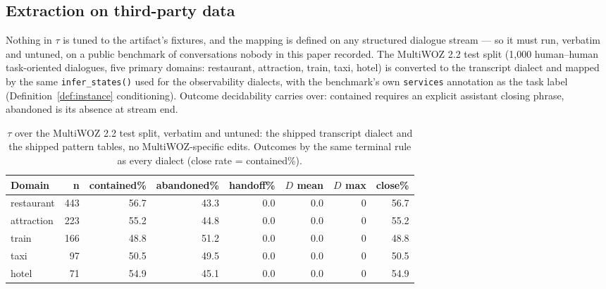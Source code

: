 \subsection{Extraction on third-party data}
\label{sec:multiwoz}
Nothing in $\tau$ is tuned to the artifact's fixtures, and the mapping is defined on any
structured dialogue stream --- so it must run, verbatim and untuned, on a public benchmark of
conversations nobody in this paper recorded.
The MultiWOZ 2.2 test split \citep{multiwoz2026,multiwoz2018} (1{,}000 human--human task-oriented dialogues,
five primary domains: restaurant, attraction, train, taxi, hotel) is converted to the
transcript dialect and mapped by the same \texttt{infer\_states()} used for the observability
dialects, with the benchmark's own \texttt{services} annotation as the task label
(Definition~\ref{def:instance} conditioning).
Outcome decidability carries over: contained requires an explicit assistant closing phrase,
abandoned is its absence at stream end.

\begin{table}[t]
\centering\small
\begin{tabular}{@{}lrrrrrrr@{}}
\toprule
\textbf{Domain} & \textbf{n} & \textbf{contained\%} & \textbf{abandoned\%} & \textbf{handoff\%} & \textbf{$D$ mean} & \textbf{$D$ max} & \textbf{close\%} \\
\midrule
restaurant & 443 & 56.7 & 43.3 & 0.0 & 0.0 & 0 & 56.7 \\
attraction & 223 & 55.2 & 44.8 & 0.0 & 0.0 & 0 & 55.2 \\
train      & 166 & 48.8 & 51.2 & 0.0 & 0.0 & 0 & 48.8 \\
taxi       &  97 & 50.5 & 49.5 & 0.0 & 0.0 & 0 & 50.5 \\
hotel      &  71 & 54.9 & 45.1 & 0.0 & 0.0 & 0 & 54.9 \\
\bottomrule
\end{tabular}
\caption{$\tau$ over the MultiWOZ 2.2 test split, verbatim and untuned: the shipped
transcript dialect and the shipped pattern tables, no MultiWOZ-specific edits. Outcomes by
the same terminal rule as every dialect (close rate = contained\%).}
\label{tab:multiwoz}
\end{table}

